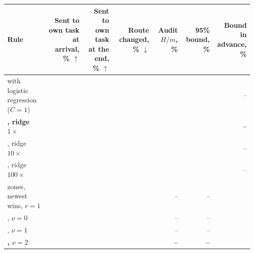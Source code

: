 {\scriptsize\setlength{\tabcolsep}{2.5pt}\begin{tabular}{p{1.6in}rrrrrr}
    \toprule
    Rule & \shortstack[r]{Sent to\\own task\\at arrival,\\\% $\uparrow$} & \shortstack[r]{Sent to\\own task\\at the end,\\\% $\uparrow$} & \shortstack[r]{Route\\changed,\\\% $\downarrow$} & \shortstack[r]{Audit\\$H/m$, \%} & \shortstack[r]{95\% bound,\\\%} & \shortstack[r]{Bound in\\advance, \%} \\
    \midrule
    \recog{} with logistic regression ($C = 1$) & \AudDevJCOneArrive{} & \AudDevJCOneEnd{} & \AudDevJCOneChanged{} & \AudDevJCOneAuditEst{} & \AudDevJCOneAuditBound{} & -- \\
    \textbf{\recog{}, ridge $1\times$} & \textbf{\AudDevLLamOneArrive{}} & \textbf{\AudDevLLamOneEnd{}} & \textbf{\AudDevLLamOneChanged{}} & \textbf{\AudDevLLamOneAuditEst{}} & \textbf{\AudDevLLamOneAuditBound{}} & \textbf{--} \\
    \recog{}, ridge $10\times$ & \AudDevLLamTenArrive{} & \AudDevLLamTenEnd{} & \AudDevLLamTenChanged{} & \AudDevLLamTenAuditEst{} & \AudDevLLamTenAuditBound{} & -- \\
    \recog{}, ridge $100\times$ & \AudDevLLamHundredArrive{} & \AudDevLLamHundredEnd{} & \AudDevLLamHundredChanged{} & \AudDevLLamHundredAuditEst{} & \AudDevLLamHundredAuditBound{} & -- \\
    zones, newest wins, $r = 1$ & \AudDevClaimsROneArrive{} & \AudDevClaimsROneEnd{} & \AudDevClaimsROneChanged{} & -- & -- & \AudDevClaimsROneBound{} \\
    \handicap{}, $\nu = 0$ & \AudDevHPrimeTZeroArrive{} & \AudDevHPrimeTZeroEnd{} & \AudDevHPrimeTZeroChanged{} & -- & -- & \AudDevHPrimeTZeroBound{} \\
    \handicap{}, $\nu = 1$ & \AudDevHPrimeTOneArrive{} & \AudDevHPrimeTOneEnd{} & \AudDevHPrimeTOneChanged{} & -- & -- & \AudDevHPrimeTOneBound{} \\
    \textbf{\handicap{}, $\nu = 2$} & \textbf{\AudDevHPrimeTTwoArrive{}} & \textbf{\AudDevHPrimeTTwoEnd{}} & \textbf{\AudDevHPrimeTTwoChanged{}} & \textbf{--} & \textbf{--} & \textbf{\AudDevHPrimeTTwoBound{}} \\

\end{tabular}}
